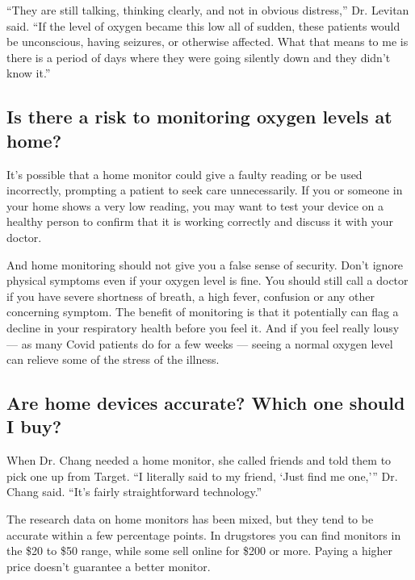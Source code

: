 ``They are still talking, thinking clearly, and not in obvious
distress,'' Dr. Levitan said. ``If the level of oxygen became this low
all of sudden, these patients would be unconscious, having seizures, or
otherwise affected. What that means to me is there is a period of days
where they were going silently down and they didn't know it.''

\hypertarget{is-there-a-risk-to-monitoring-oxygen-levels-at-home}{%
\subsection{Is there a risk to monitoring oxygen levels at
home?}\label{is-there-a-risk-to-monitoring-oxygen-levels-at-home}}

It's possible that a home monitor could give a faulty reading or be used
incorrectly, prompting a patient to seek care unnecessarily. If you or
someone in your home shows a very low reading, you may want to test your
device on a healthy person to confirm that it is working correctly and
discuss it with your doctor.

And home monitoring should not give you a false sense of security. Don't
ignore physical symptoms even if your oxygen level is fine. You should
still call a doctor if you have severe shortness of breath, a high
fever, confusion or any other concerning symptom. The benefit of
monitoring is that it potentially can flag a decline in your respiratory
health before you feel it. And if you feel really lousy --- as many
Covid patients do for a few weeks --- seeing a normal oxygen level can
relieve some of the stress of the illness.

\hypertarget{are-home-devices-accurate-which-one-should-i-buy}{%
\subsection{Are home devices accurate? Which one should I
buy?}\label{are-home-devices-accurate-which-one-should-i-buy}}

When Dr. Chang needed a home monitor, she called friends and told them
to pick one up from Target. ``I literally said to my friend, `Just find
me one,''' Dr. Chang said. ``It's fairly straightforward technology.''

The research data on home monitors has been mixed, but they tend to be
accurate within a few percentage points. In drugstores you can find
monitors in the \$20 to \$50 range, while some sell online for \$200 or
more. Paying a higher price doesn't guarantee a better monitor.

